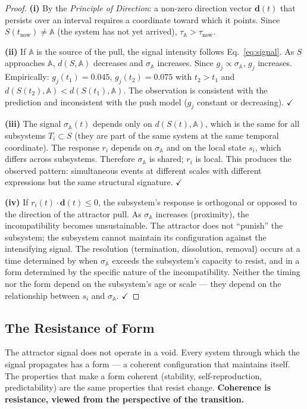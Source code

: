 \documentclass[12pt,a4paper]{article}
\newcommand{\attr}{\mathbb{A}}
\newcommand{\gj}{g_j}
\begin{document}
\begin{proof}
\textbf{(i)} By the \emph{Principle of Direction}: a non-zero direction vector $\mathbf{d}(t)$ that persists over an interval requires a coordinate toward which it points. Since $S(t_{\mathrm{now}}) \neq \attr$ (the system has not yet arrived), $\tau_\attr > \tau_{\mathrm{now}}$.

\textbf{(ii)} If $\attr$ is the source of the pull, the signal intensity follows Eq.~\eqref{eq:signal}. As $S$ approaches $\attr$, $d(S, \attr)$ decreases and $\sigma_{\mathbb{A}}$ increases. Since $\gj \propto \sigma_{\mathbb{A}}$, $\gj$ increases. Empirically: $\gj(t_1) = 0.045$, $\gj(t_2) = 0.075$ with $t_2 > t_1$ and $d(S(t_2), \attr) < d(S(t_1), \attr)$. The observation is consistent with the prediction and inconsistent with the push model ($\gj$ constant or decreasing). $\checkmark$

\textbf{(iii)} The signal $\sigma_{\mathbb{A}}(t)$ depends only on $d(S(t), \attr)$, which is the same for all subsystems $T_i \subset S$ (they are part of the same system at the same temporal coordinate). The response $r_i$ depends on $\sigma_{\mathbb{A}}$ and on the local state $s_i$, which differs across subsystems. Therefore $\sigma_{\mathbb{A}}$ is shared; $r_i$ is local. This produces the observed pattern: simultaneous events at different scales with different expressions but the same structural signature. $\checkmark$

\textbf{(iv)} If $r_i(t) \cdot \mathbf{d}(t) \leq 0$, the subsystem's response is orthogonal or opposed to the direction of the attractor pull. As $\sigma_{\mathbb{A}}$ increases (proximity), the incompatibility becomes unsustainable. The attractor does not ``punish'' the subsystem; the subsystem cannot maintain its configuration against the intensifying signal. The resolution (termination, dissolution, removal) occurs at a time determined by when $\sigma_{\mathbb{A}}$ exceeds the subsystem's capacity to resist, and in a form determined by the specific nature of the incompatibility. Neither the timing nor the form depend on the subsystem's age or scale --- they depend on the relationship between $s_i$ and $\sigma_{\mathbb{A}}$. $\checkmark$
\end{proof}


\subsection{The Resistance of Form}\label{subsec:resistance}

The attractor signal does not operate in a void. Every system through which the signal propagates has a form --- a coherent configuration that maintains itself. The properties that make a form coherent (stability, self-reproduction, predictability) are the same properties that resist change. \textbf{Coherence is resistance, viewed from the perspective of the transition.}
\end{document}
